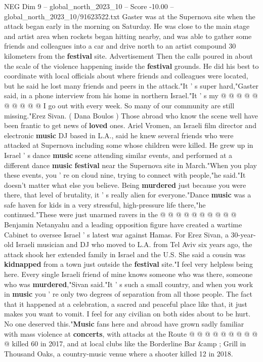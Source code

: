 \begin{textsample}{NEG Dim 9 – global\_north\_2023\_10 – Score -10.00 – global\_north\_2023\_10/91623522.txt}
Gaster was at the Supernova site when the attack began early in the morning on Saturday.
He was close to the main stage and artist area when rockets began hitting nearby, and was able to gather some friends and colleagues into a car and drive north to an artist compound 30 kilometers from the \textbf{festival} site.
Advertisement Then the calls poured in about the scale of the violence happening inside the \textbf{festival} grounds.
He did his best to coordinate with local officials about where friends and colleagues were located, but he said he lost many friends and peers in the attack."It ' s super hard,"Gaster said, in a phone interview from his home in northern Israel."It ' s my @ @ @ @ @ @ @ @ @ @ I go out with every week.
So many of our community are still missing."Erez Sivan. ( Dana Boulos ) Those abroad who know the scene well have been frantic to get news of \textbf{loved} ones.
Ariel Vromen, an Israeli film director and electronic \textbf{music} DJ based in L.A., said he knew several friends who were attacked at Supernova including some whose children were killed.
He grew up in Israel ' s dance \textbf{music} scene attending similar events, and performed at a different dance \textbf{music} \textbf{festival} near the Supernova site in March."When you play these events, you ' re on cloud nine, trying to connect with people,"he said."It doesn't matter what else you believe.
Being \textbf{murdered} just because you were there, that level of brutality, it ' s really alien for everyone."Dance \textbf{music} was a safe haven for kids in a very stressful, high-pressure life there,"he continued."These were just unarmed ravers in the @ @ @ @ @ @ @ @ @ @ Benjamin Netanyahu and a leading opposition figure have created a wartime Cabinet to oversee Israel ' s latest war against Hamas.
For Erez Sivan, a 30-year-old Israeli musician and DJ who moved to L.A. from Tel Aviv six years ago, the attack shook her extended family in Israel and the U.S.
She said a cousin was \textbf{kidnapped} from a town just outside the \textbf{festival} site."I feel very helpless being here.
Every single Israeli friend of mine knows someone who was there, someone who was \textbf{murdered},"Sivan said."It ' s such a small country, and when you work in \textbf{music} you ' re only two degrees of separation from all those people.
The fact that it happened at a celebration, a sacred and peaceful place like that, it just makes you want to vomit.
I feel for any civilian on both sides about to be hurt.
No one deserved this."\textbf{Music} fans here and abroad have grown sadly familiar with mass violence at \textbf{concerts}, with attacks at the Route @ @ @ @ @ @ @ @ @ @ killed 60 in 2017, and at local clubs like the Borderline Bar \&amp ; Grill in Thousand Oaks, a country-music venue where a shooter killed 12 in 2018.

\end{textsample}
